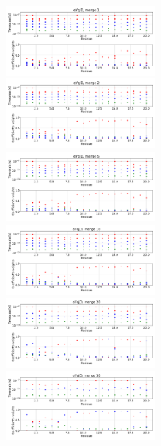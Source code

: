 \documentclass[12pt]{article}
\begin{document}
\begin{figure}
\centering
\includegraphics[width=0.5\textwidth]{eYqjD_1.png}
\includegraphics[width=0.5\textwidth]{eYqjD_2.png}
\includegraphics[width=0.5\textwidth]{eYqjD_5.png}
\includegraphics[width=0.5\textwidth]{eYqjD_10.png}
\includegraphics[width=0.5\textwidth]{eYqjD_20.png}
\includegraphics[width=0.5\textwidth]{eYqjD_30.png}
\end{figure}
\end{document}
